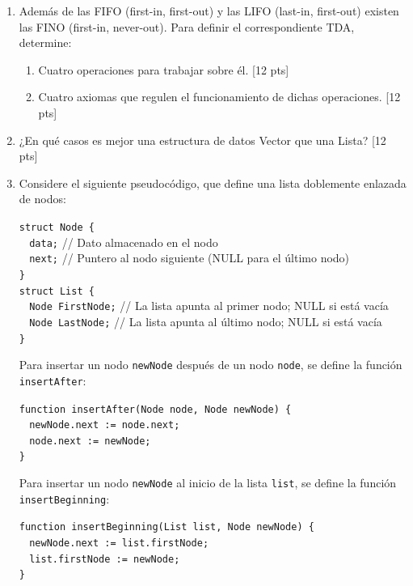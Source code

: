 \documentclass[letter,12pt,oneside]{book}
\theoremstyle{definition}
\begin{document}
\begin{enumerate}
    \item Además de las FIFO (first-in, first-out) y las LIFO (last-in, first-out) existen las FINO (first-in, never-out). Para definir el correspondiente TDA, determine:
    \begin{enumerate}
        \item Cuatro operaciones para trabajar sobre él. \tabto{76ex} [12 pts]
        \item Cuatro axiomas que regulen el funcionamiento de dichas operaciones. \tabto{76ex} [12 pts]
    \end{enumerate}
    
    \item ¿En qué casos es mejor una estructura de datos Vector que una Lista? \tabto{81ex} [12 pts]
    
    \item Considere el siguiente pseudocódigo, que define una lista doblemente enlazada de nodos:

    \texttt{struct Node \{}\\
    $~~~~$\texttt{data;} \tabto{23ex}// Dato almacenado en el nodo\\
    $~~~~$\texttt{next;} \tabto{23ex}// Puntero al nodo siguiente (NULL para el último nodo)\\
    \texttt{\}}\\
    \texttt{struct List \{}\\
    $~~~~$\texttt{Node FirstNode;} \tabto{23ex}// La lista apunta al primer nodo; NULL si está vacía\\
    $~~~~$\texttt{Node LastNode;} \tabto{23ex}// La lista apunta al último nodo; NULL si está vacía\\
    \texttt{\}}
    
    Para insertar un nodo \texttt{newNode} después de un nodo \texttt{node}, se define la función \texttt{insertAfter}:
    
    \texttt{function insertAfter(Node node, Node newNode) \{}\\
    $~~~~$\texttt{newNode.next := node.next;}\\
    $~~~~$\texttt{node.next := newNode;}\\
    \texttt{\}}
    
    Para insertar un nodo \texttt{newNode} al inicio de la lista \texttt{list}, se define la función \texttt{insertBeginning}:
    
    \texttt{function insertBeginning(List list, Node newNode) \{}\\
    $~~~~$\texttt{newNode.next   := list.firstNode;}\\
    $~~~~$\texttt{list.firstNode := newNode;}\\
    \texttt{\}}


\end{enumerate}
\end{document}
